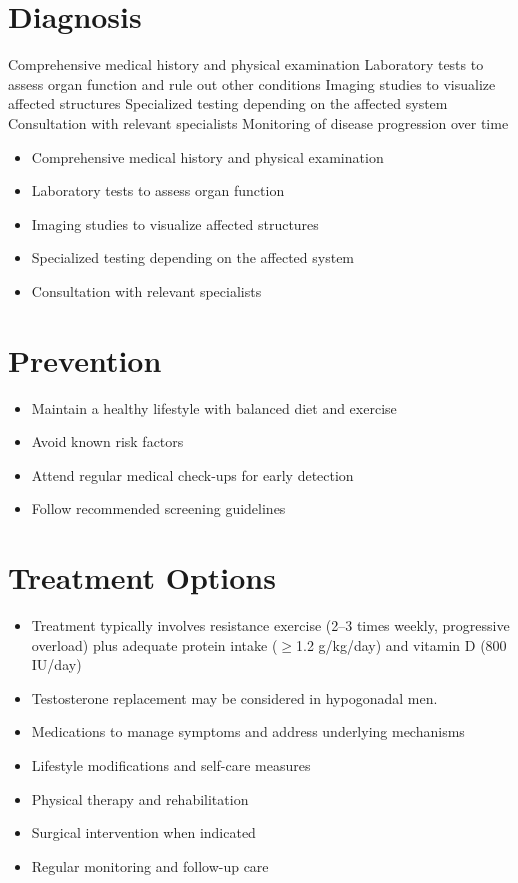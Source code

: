 \section{Diagnosis}
Comprehensive medical history and physical examination Laboratory tests to assess organ function and rule out other conditions Imaging studies to visualize affected structures Specialized testing depending on the affected system Consultation with relevant specialists Monitoring of disease progression over time

\begin{itemize}[noitemsep]
  \item Comprehensive medical history and physical examination
  \item Laboratory tests to assess organ function
  \item Imaging studies to visualize affected structures
  \item Specialized testing depending on the affected system
  \item Consultation with relevant specialists
\end{itemize}
\section{Prevention}
\begin{itemize}[noitemsep]
  \item Maintain a healthy lifestyle with balanced diet and exercise
  \item Avoid known risk factors
  \item Attend regular medical check-ups for early detection
  \item Follow recommended screening guidelines
\end{itemize}
\section{Treatment Options}
\begin{itemize}[noitemsep]
  \item Treatment typically involves resistance exercise (2--3 times weekly, progressive overload) plus adequate protein intake ($\ge$1.2 g/kg/day) and vitamin D (800 IU/day)
  \item Testosterone replacement may be considered in hypogonadal men.
  \item Medications to manage symptoms and address underlying mechanisms
  \item Lifestyle modifications and self-care measures
  \item Physical therapy and rehabilitation
  \item Surgical intervention when indicated
  \item Regular monitoring and follow-up care
\end{itemize}

